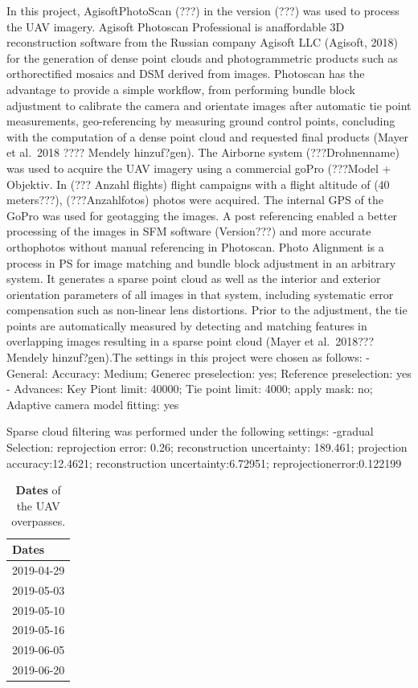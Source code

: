 \documentclass[]{article}
\begin{document}
In this project, AgisoftPhotoScan (???) in the version (???) was used to
process the UAV imagery. Agisoft Photoscan Professional is anaffordable
3D reconstruction software from the Russian company Agisoft LLC
(Agisoft, 2018) for the generation of dense point clouds and
photogrammetric products such as orthorectified mosaics and DSM derived
from images. Photoscan has the advantage to provide a simple workflow,
from performing bundle block adjustment to calibrate the camera and
orientate images after automatic tie point measurements, geo-referencing
by measuring ground control points, concluding with the computation of a
dense point cloud and requested final products (Mayer et al.~2018 ????
Mendely hinzuf?gen). The Airborne system (???Drohnenname) was used to
acquire the UAV imagery using a commercial goPro (???Model + Objektiv.
In (??? Anzahl flights) flight campaigns with a flight altitude of (40
meters???), (???Anzahlfotos) photos were acquired. The internal GPS of
the GoPro was used for geotagging the images. A post referencing enabled
a better processing of the images in SFM software (Version???) and more
accurate orthophotos without manual referencing in Photoscan. Photo
Alignment is a process in PS for image matching and bundle block
adjustment in an arbitrary system. It generates a sparse point cloud as
well as the interior and exterior orientation parameters of all images
in that system, including systematic error compensation such as
non-linear lens distortions. Prior to the adjustment, the tie points are
automatically measured by detecting and matching features in overlapping
images resulting in a sparse point cloud (Mayer et al.~2018??? Mendely
hinzuf?gen).The settings in this project were chosen as follows: -
General: Accuracy: Medium; Generec preselection: yes; Reference
preselection: yes - Advances: Key Piont limit: 40000; Tie point limit:
4000; apply mask: no; Adaptive camera model fitting: yes

Sparse cloud filtering was performed under the following settings:
-gradual Selection: reprojection error: 0.26; reconstruction
uncertainty: 189.461; projection accuracy:12.4621; reconstruction
uncertainty:6.72951; reprojectionerror:0.122199

\begin{table}[!h]

\caption{\label{tab:dates-table}\textbf{Dates} of the UAV overpasses.}
\centering
\begin{tabular}[t]{l}
\toprule
Dates\\
\midrule
2019-04-29\\
2019-05-03\\
2019-05-10\\
2019-05-16\\
2019-06-05\\
2019-06-20\\
\bottomrule
\end{tabular}
\end{table}
\end{document}
